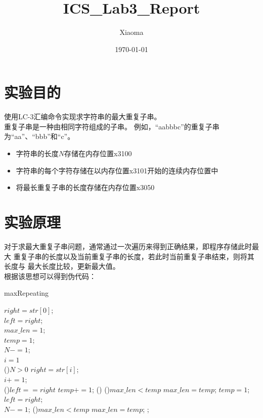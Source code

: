 \documentclass[12pt, a4paper, oneside]{ctexart}
\title{ICS\_Lab3\_Report}
\author{Xiaoma}
\date{\today}
\begin{document}
\maketitle
\section*{实验目的}
使用LC-3汇编命令实现求字符串的最大重复子串。\\
重复子串是一种由相同字符组成的子串。
例如，“aabbbc”的重复子串为“aa”、“bbb”和“c”。
\begin{itemize}
    \item 字符串的长度$N$存储在内存位置x3100
    \item 字符串的每个字符存储在以内存位置x3101开始的连续内存位置中
    \item 将最长重复子串的长度存储在内存位置x3050

\end{itemize}

\section*{实验原理}
对于求最大重复子串问题，通常通过一次遍历来得到正确结果，即程序存储此时最大
重复子串的长度以及当前重复子串的长度，若此时当前重复子串结束，则将其长度与
最大长度比较，更新最大值。\\
根据该思想可以得到伪代码：

\begin{algorithm*}
    \caption{maxRepeating}
    \label{alg:algorithm}
    \BlankLine
    $right = str[0]$;\\
    $left = right$;\\
    $max\_len = 1$;\\
    $temp = 1$;\\
    $N -= 1$;\\
    $i = 1$\\
    \While(){$N > 0$}{
        $right = str[i]$;\\
        $i += 1$;\\
        \If(){$left == right$}{
            $temp += 1$;
        }
        \Else(){
            \If(){$max\_len < temp$}{
                $max\_len = temp$;
            }
            $temp = 1$;
        }
        $left = right$;\\
        $N -= 1$;
    }
    \If(){$max\_len < temp$}{
        $max\_len = temp$;
    }
    ;
\end{algorithm*}
\end{document}

